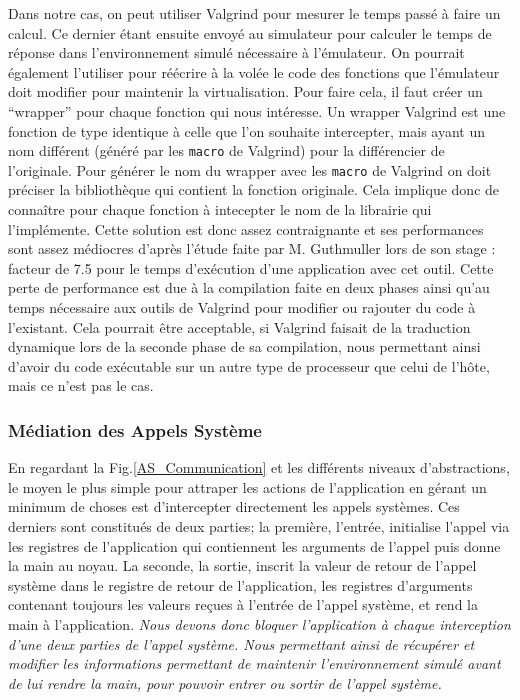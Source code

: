 Dans notre cas, on peut utiliser Valgrind pour mesurer le temps passé à faire un
calcul. Ce dernier étant ensuite envoyé au simulateur pour calculer le temps de
réponse dans l'environnement simulé nécessaire à l'émulateur. On pourrait
également l'utiliser pour réécrire à la volée le code des fonctions que
l'émulateur doit modifier pour maintenir la virtualisation. Pour faire cela, il
faut créer un ``wrapper'' pour chaque fonction qui nous intéresse. Un wrapper
Valgrind est une fonction de type identique à celle que l'on souhaite
intercepter, mais ayant un nom différent (généré par les \texttt{macro} de
Valgrind) pour la différencier de l'originale. Pour générer le nom du wrapper
avec les \texttt{macro} de Valgrind on doit préciser la bibliothèque qui
contient la fonction originale.%
Cela implique donc de connaître pour chaque fonction à intecepter le nom de la
librairie qui l'implémente. Cette solution est donc assez contraignante et ses
performances sont assez médiocres d'après l'étude faite par M. Guthmuller lors
de son stage \citep{MARION:Interception}: facteur de 7.5 pour le temps
d'exécution d'une application avec cet outil. Cette perte de performance est due
à la compilation faite en deux phases ainsi qu'au temps nécessaire aux outils de
Valgrind pour modifier ou rajouter du code à l'existant. Cela pourrait être
acceptable, si Valgrind faisait de la traduction dynamique lors de la seconde
phase de sa compilation, nous permettant ainsi d'avoir du code exécutable sur un
autre type de processeur que celui de l'hôte, mais ce n'est pas le cas.

\subsubsection{Médiation des Appels Système}

En regardant la Fig.\ref{AS_Communication} et les différents niveaux
d'abstractions, le moyen le plus simple pour attraper les actions de
l'application en gérant un minimum de choses est d'intercepter directement les
appels systèmes.  Ces derniers sont constitués de deux parties; la première,
l'entrée, initialise l'appel via les registres de l'application qui contiennent
les arguments de l'appel puis donne la main au noyau. La seconde, la sortie,
inscrit la valeur de retour de l'appel système dans le registre de retour de
l'application, les registres d'arguments contenant toujours les valeurs reçues à
l'entrée de l'appel système, et rend la main à l'application. \textit{Nous
  devons donc bloquer l'application à chaque interception d'une deux parties de
  l'appel système. Nous permettant ainsi de récupérer et modifier les
  informations permettant de maintenir l'environnement simulé avant de lui
  rendre la main, pour pouvoir entrer ou sortir de l'appel système.}

